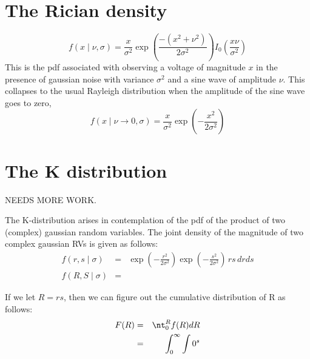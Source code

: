 \section{The Rician density}
\begin{equation} f(x\mid \nu ,\sigma )={\frac  {x}{\sigma ^{2}}}\exp \left({\frac  {-(x^{2}+\nu ^{2})}{2\sigma ^{2}}}\right)I_{0}\left({\frac  {x\nu }{\sigma ^{2}}}\right)
\end{equation}
This is the pdf associated with observing a voltage of magnitude $x$ in the presence of gaussian noise 
with variance $\sigma^2$ and a sine wave of amplitude $\nu$.  This collapses to the usual Rayleigh 
distribution when the amplitude of the sine wave goes to zero,
\begin{equation} f(x\mid \nu\rightarrow 0,\sigma )={\frac  {x}{\sigma ^{2}}}\exp \left({-\frac {x^{2}}{2\sigma ^{2}}}\right)
\end{equation}

\section{The K distribution}

NEEDS MORE WORK.

The K-distribution arises in contemplation of the pdf of the product of two (complex) gaussian random 
variables.  The joint density of the magnitude of two complex gaussian RVs is given as follows:
\begin{eqnarray}
f(r, s \mid \sigma ) &=& \exp\left(-\frac{r^2}{2\sigma^2}\right)\exp\left(-\frac{s^2}{2\sigma^2}\right)\,rs\,drds \\
f(R,S \mid \sigma )&=&
\end{eqnarray}

If we let $R = rs$, then we can figure out the cumulative distribution of R as follows:
\begin{eqnarray}
F( R) &=& \nt_0^R f(R) dR \\
         &=& \int_0^\infty \int 0^s 
\end{eqnarray}




